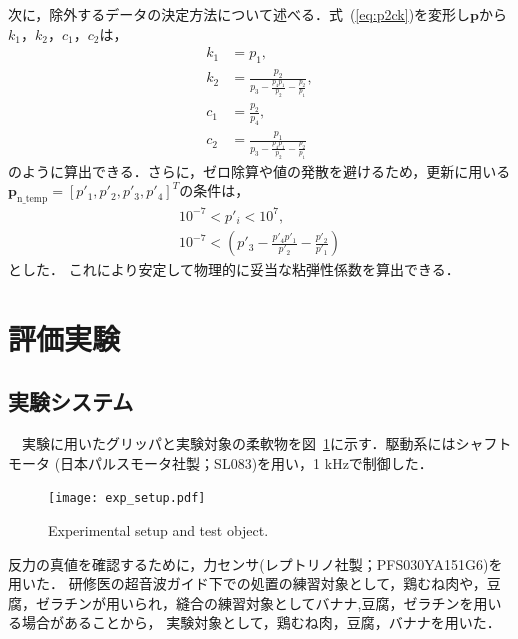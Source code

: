 \documentclass[a4paper]{jarticle}
\begin{document}
次に，除外するデータの決定方法について述べる．式~(\ref{eq:p2ck})を変形し$\mathbf{p}$から$k_1$，$k_2$，$c_1$，$c_2$は，
\begin{equation}
    \begin{aligned}
        k_1 &= p_1 ,\\
        k_2 &= \frac{p_2}{p_3 - \frac{p_4 p_1}{p_2} - \frac{p_2}{p_1}} ,\\
        c_1 &= \frac{p_2}{p_4},\\
        c_2 &= \frac{p_1}{p_3 - \frac{p_4 p_1}{p_2} - \frac{p_2}{p_1}} 
    \end{aligned}
\end{equation}
のように算出できる．さらに，ゼロ除算や値の発散を避けるため，更新に用いる$\mathbf{p}_{\mathrm{n\_temp}}=[p'_1,p'_2,p'_3,p'_4]^{T}$の条件は，
\begin{equation}
    \begin{aligned}
        10^{-7} < {p}'_{i} < 10^{7} ,\\
        10^{-7} < \left( p'_3 - \frac{p'_4 p'_1}{p'_2} - \frac{p'_2}{p'_1} \right)
    \end{aligned}
\end{equation}
とした．
これにより安定して物理的に妥当な粘弾性係数を算出できる．
\section{評価実験}
\subsection{実験システム}
　実験に用いたグリッパと実験対象の柔軟物を図~\ref{fig:exp_setup}に示す．駆動系にはシャフトモータ (日本パルスモータ社製；SL083)を用い，1 kHzで制御した．
\begin{figure}[tb]
    \centering
    \texttt{[image: exp\_setup.pdf]}
    \caption{Experimental setup and test object.}
    \label{fig:exp_setup}
\end{figure}
反力の真値を確認するために，力センサ(レプトリノ社製；PFS030YA151G6)を用いた．
研修医の超音波ガイド下での処置の練習対象として，鶏むね肉や，豆腐，ゼラチンが用いられ，縫合の練習対象としてバナナ,豆腐，ゼラチンを用いる場合があることから\cite{exp_ref1}\cite{exp_ref2}\cite{exp_ref3}，
実験対象として，鶏むね肉，豆腐，バナナを用いた．
\end{document}
